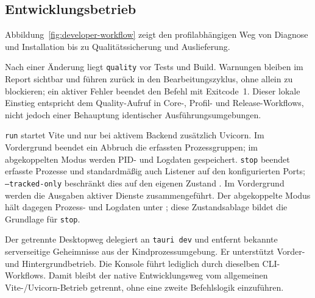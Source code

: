 \subsection{Entwicklungsbetrieb}
\label{subsec:entwicklungsbetrieb}

Abbildung~\ref{fig:developer-workflow} zeigt den profilabhängigen Weg von
Diagnose und Installation bis zu Qualitätssicherung und Auslieferung.



Nach einer Änderung liegt \texttt{quality} vor Tests und Build. Warnungen
bleiben im Report sichtbar und führen zurück in den Bearbeitungszyklus, ohne
allein zu blockieren; ein aktiver Fehler beendet den Befehl mit Exitcode~1.
Dieser lokale Einstieg entspricht dem Quality-Aufruf in Core-, Profil- und
Release-Workflows, nicht jedoch einer Behauptung identischer
Ausführungsumgebungen.

\texttt{run} startet Vite und nur bei aktivem Backend zusätzlich Uvicorn. Im
Vordergrund beendet ein Abbruch die erfassten Prozessgruppen; im abgekoppelten
Modus werden PID- und Logdaten gespeichert. \texttt{stop} beendet erfasste
Prozesse und standardmäßig auch Listener auf den konfigurierten Ports;
\texttt{--tracked-only} beschränkt dies auf den eigenen Zustand
\parencite{kleiveist2026control,kleiveist2026tooling}.
Im Vordergrund werden die Ausgaben aktiver Dienste zusammengeführt. Der
abgekoppelte Modus hält dagegen Prozess- und Logdaten unter
; diese Zustandsablage bildet die Grundlage für
\texttt{stop}.

Der getrennte Desktopweg delegiert an \texttt{tauri dev} und entfernt bekannte
serverseitige Geheimnisse aus der Kindprozessumgebung. Er unterstützt Vorder-
und Hintergrundbetrieb. Die Konsole führt lediglich durch dieselben
CLI-Workflows.
Damit bleibt der native Entwicklungsweg vom allgemeinen Vite-/Uvicorn-Betrieb
getrennt, ohne eine zweite Befehlslogik einzuführen.
